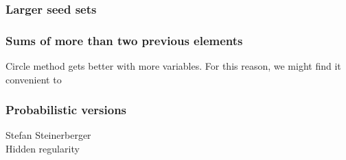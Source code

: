 \documentclass{article}
\theoremstyle{definition}
\theoremstyle{remark}
\numberwithin{equation}{section}
\begin{document}
{\subsubsection{Larger seed sets}
\subsubsection{Sums of more than two previous elements}

Circle method gets better with more variables.  For this reason, we
might find it convenient to 

\subsubsection{Probabilistic versions}











\begin{thebibliography}{9}
Stefan Steinerberger\\
Hidden regularity


\end{thebibliography}}
\end{document}
